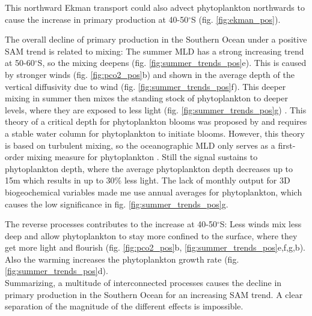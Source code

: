 This northward Ekman transport could also advect phytoplankton northwards to cause the increase in primary production at 40-50$^\circ$S (fig. \ref{fig:ekman_pos}).

The overall decline of primary production in the Southern Ocean under a positive \acs{SAM} trend is related to mixing:
The summer \ac{MLD} has a strong increasing trend at 50-60$^\circ$S, so the mixing deepens (fig. \ref{fig:summer_trends_pos}e). This is caused by stronger winds (fig. \ref{fig:pco2_pos}b) and shown in the average depth of the vertical diffusivity due to wind (fig. \ref{fig:summer_trends_pos}f). This deeper mixing in summer then mixes the standing stock of phytoplankton to deeper levels, where they are exposed to less light (fig. \ref{fig:summer_trends_pos}g) \citep{Margalef1997}. This theory of a critical depth for phytoplankton blooms was proposed by \cite{Sverdrup1953} and requires a stable water column for phytoplankton to initiate blooms. However, this theory is based on turbulent mixing, so the oceanographic \acs{MLD} only serves as a first-order mixing measure for phytoplankton \citep{Franks2014}. Still the signal sustains to phytoplankton depth, where the average phytoplankton depth decreases up to 15m which results in up to 30\% less light. The lack of monthly output for 3D biogeochemical variables made me use annual averages for phytoplankton, which causes the low significance in fig. \ref{fig:summer_trends_pos}g. 

The reverse processes contributes to the increase at 40-50$^\circ$S: Less winds mix less deep and allow phytoplankton to stay more confined to the surface, where they get more light and flourish (fig. \ref{fig:pco2_pos}b, \ref{fig:summer_trends_pos}e,f,g,b). Also the warming increases the phytoplankton growth rate (fig. \ref{fig:summer_trends_pos}d).
\\

Summarizing, a multitude of interconnected processes causes the decline in primary production in the Southern Ocean for an increasing \acs{SAM} trend. A clear separation of the magnitude of the different effects is impossible.
 

